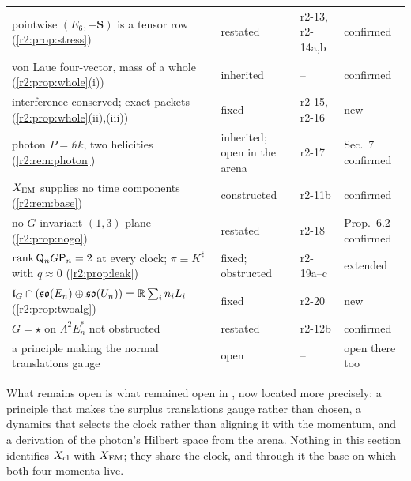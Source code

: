 {\begin{longtable}{@{}>{\raggedright\arraybackslash}p{6.9cm}>{\raggedright\arraybackslash}p{2.1cm}>{\raggedright\arraybackslash}p{1.9cm}>{\raggedright\arraybackslash}p{3.0cm}@{}}
pointwise $(E_6,-\mathbf S)$ is a tensor row (\cref{r2:prop:stress}) & restated & r2-13, r2-14a,b & confirmed\\
von Laue four-vector, mass of a whole (\cref{r2:prop:whole}(i)) & inherited & -- & confirmed\\
interference conserved; exact packets (\cref{r2:prop:whole}(ii),(iii)) & fixed & r2-15, r2-16 & new\\
photon $P=\hbar k$, two helicities (\cref{r2:rem:photon}) & inherited; open in the arena & r2-17 & Sec.~7 confirmed\\
$X_{\rm EM}$ supplies no time components (\cref{r2:rem:base}) & constructed & r2-11b & confirmed\\
no $G$-invariant $(1,3)$ plane (\cref{r2:prop:nogo}) & restated & r2-18 & Prop.~6.2 confirmed\\
$\operatorname{rank}\mathsf Q_nG\mathsf P_n=2$ at every clock; $\pi\equiv K^\sharp$ with $q\approx0$ (\cref{r2:prop:leak}) & fixed; obstructed & r2-19a--c & extended\\
$\mathfrak l_G\cap(\mathfrak{so}(E_n)\oplus\mathfrak{so}(U_n))=\mathbb{R}\sum_in_iL_i$ (\cref{r2:prop:twoalg}) & fixed & r2-20 & new\\
$G=\star$ on $\Lambda^2E_n^*$ not obstructed & restated & r2-12b & confirmed\\
a principle making the normal translations gauge & open & -- & open there too\\
\bottomrule
\end{longtable}}

What remains open is what remained open in \cite{FMB}, now located more precisely: a principle that makes the surplus translations gauge rather than
chosen, a dynamics that selects the clock rather than aligning it with the momentum, and a derivation of the photon's Hilbert space from the arena. Nothing
in this section identifies $X_{\rm cl}$ with $X_{\rm EM}$; they share the clock, and through it the base on which both four-momenta live.
